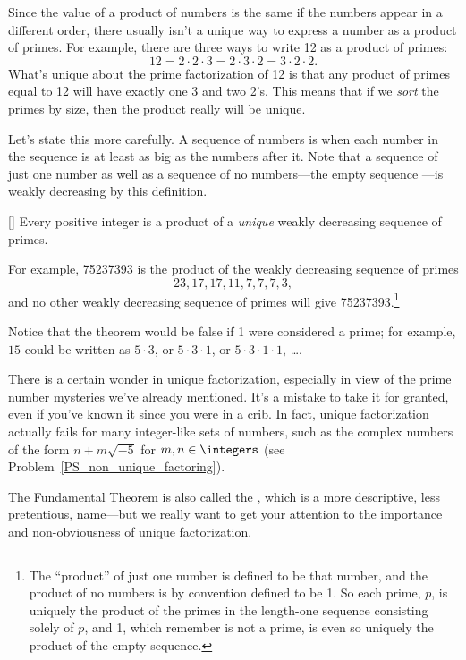 Since the value of a product of numbers is the same if the numbers
appear in a different order, there usually isn't a unique way to
express a number as a product of primes.  For example, there are three
ways to write 12 as a product of primes:
\[
12 = 2 \cdot 2 \cdot 3 = 2 \cdot 3 \cdot 2 = 3 \cdot 2 \cdot 2.
\]
What's unique about the prime factorization of 12 is that any product
of primes equal to 12 will have exactly one 3 and two 2's.  This means
that if we \emph{sort} the primes by size, then the product really
will be unique.

Let's state this more carefully.  A sequence of numbers is
\emph{} when each number in the sequence is at
least as big as the numbers after it.  Note that a sequence of just
one number as well as a sequence of no numbers---the empty sequence
---is weakly decreasing by this definition.

\begin{theorem}\label{thm:unique_factor}[]
Every positive integer is a product of a \emph{unique} weakly
decreasing sequence of primes.
\end{theorem}

For example, 75237393 is the product of the weakly decreasing sequence
of primes
\[
23, 17, 17, 11, 7, 7, 7, 3,
\]
and no other weakly decreasing sequence of primes will give
75237393.\footnote{The ``product'' of just one number is defined to be
  that number, and the product of no numbers is by convention defined
  to be 1.  So each prime, $p$, is uniquely the product of the primes
  in the length-one sequence consisting solely of $p$, and 1, which
  remember is not a prime, is even so uniquely the product of the
  empty sequence.}

Notice that the theorem would be false if 1 were considered a prime;
for example, $15$ could be written as $5 \cdot 3$, or $5 \cdot 3 \cdot
1$, or $5 \cdot 3 \cdot 1 \cdot 1$, \dots.

There is a certain wonder in unique factorization, especially in view
of the prime number mysteries we've already mentioned.  It's a mistake
to take it for granted, even if you've known it since you were in a
crib.  In fact, unique factorization actually fails for many
integer-like sets of numbers, such as the complex numbers of the
form $n + m\sqrt{-5}$ for $m,n \in \integers$ (see
Problem~\ref{PS_non_unique_factoring}).

The Fundamental Theorem is also called the , which is a more descriptive, less pretentious, name---but
we really want to get your attention to the importance and
non-obviousness of unique factorization.

